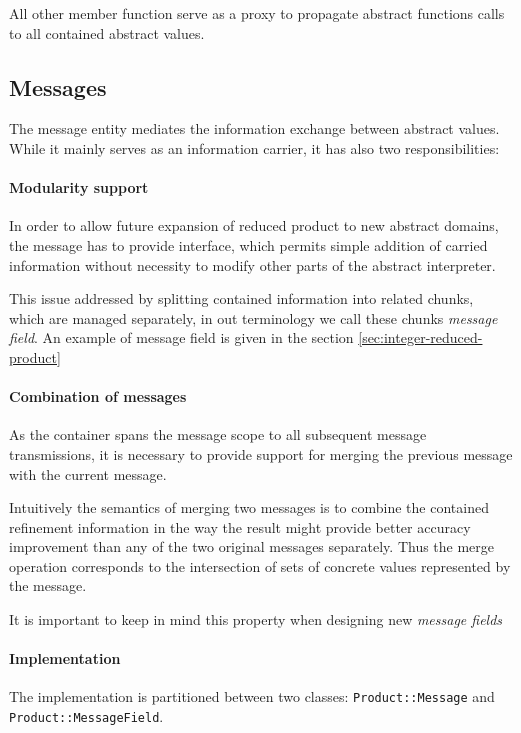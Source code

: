 \documentclass[12pt,oneside]{fithesis2}
\theoremstyle{definition}
\begin{document}
All other member function serve as a proxy to propagate abstract functions calls to all contained abstract values.

\subsection{Messages}

The message entity mediates the information exchange between abstract values. While it mainly serves as an information carrier, it has also two responsibilities:

\paragraph{Modularity support}
In order to allow future expansion of reduced product to new abstract domains, the message has to provide interface, which permits simple addition of carried information without necessity to modify other parts of the abstract interpreter.

This issue addressed by splitting contained information into related chunks, which are managed separately, in out terminology we call these chunks \textit{message field}. An example of message field is given in the section \ref{sec:integer-reduced-product}

\paragraph{Combination of messages}
As the container spans the message scope to all subsequent message transmissions, it is necessary to provide support for merging the previous message with the current message.

Intuitively the semantics of merging two messages is to combine the contained refinement information in the way the result might provide better accuracy improvement than any of the two original messages separately. Thus the merge operation corresponds to the intersection of sets of concrete values represented by the message.

It is important to keep in mind this property when designing new \textit{message fields}

\paragraph{Implementation}
The implementation is partitioned between two classes: \texttt{Product::Message} and \texttt{Product::MessageField}.
\end{document}
